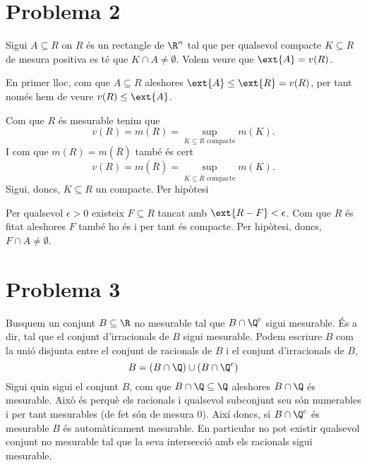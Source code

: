 \documentclass[12pt]{article}
\begin{document}
\section*{Problema 2}
Sigui \( A \subseteq R \) on \( R \) és un rectangle de \( \R^n \) tal que per qualsevol
compacte \( K \subseteq R \) de mesura positiva es té que \( K \cap A \neq \emptyset \).
Volem veure que \( \ext{A} = v(R) \). 

En primer lloc, com que \( A \subseteq R \) aleshores \( \ext{A} \leq \ext{R} = v(R) \),
per tant només hem de veure \( v(R) \leq \ext{A} \).

Com que \( R \) és mesurable tenim que
\begin{equation*}
	v(R) = m(R) = \sup_{K \subseteq R \text{ compacte}} m(K).
\end{equation*}
I com que \( m(R) = m(\bar{R}) \) també és cert
\begin{equation*}
	v(R) = m(\bar{R}) = \sup_{K \subseteq \bar{R} \text{ compacte}} m(K).
\end{equation*}
Sigui, doncs, \( K \subseteq R \) un compacte. Per hipòtesi 

Per qualsevol \( \epsilon > 0 \) existeix \( F \subseteq R \) tancat amb \( \ext{R - F} <
\epsilon \). Com que \( R \) és fitat aleshores \( F \) també ho és i per tant és
compacte. Per hipòtesi, doncs, \( F \cap A \neq \emptyset \).

\section*{Problema 3}
Busquem un conjunt \( B \subseteq \R \) no mesurable tal que \( B \cap \Q^c \) sigui
mesurable. És a dir, tal que el conjunt d'irracionals de \( B \) sigui mesurable. Podem
escriure \( B \) com la unió disjunta entre el conjunt de racionals de \( B \) i el
conjunt d'irracionals de \( B \),
\begin{equation*}
	B = (B \cap \Q) \cup (B \cap \Q^c) 
\end{equation*}
Sigui quin sigui el conjunt \( B \), com que \( B \cap \Q \subseteq \Q \) aleshores \( B
\cap \Q \) és mesurable. Això és perquè els racionals i qualsevol subconjunt seu són
numerables i per tant mesurables (de fet són de mesura 0). Així doncs, si \( B \cap \Q^c
\) és mesurable \( B \) és automàticament mesurable. En particular no pot existir
qualsevol conjunt no mesurable tal que la seva intersecció amb els racionals sigui
mesurable.
\end{document}
